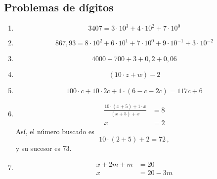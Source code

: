 \documentclass{sn-guia}
\begin{document}
\subsection{Problemas de dígitos}
\begin{enumerate}
    \item \begin{equation*}
        3407 = 3\cdot 10^3 + 4\cdot 10^2 + 7\cdot 10^0
    \end{equation*}
    \item \begin{equation*}
        867,93 = 8\cdot 10^2 + 6\cdot 10^1 + 7\cdot 10^0 + 9\cdot 10^{-1} + 3\cdot 10^{-2}
    \end{equation*}
    \item \begin{equation*}
        4000 + 700 + 3 + 0,2 + 0,06
    \end{equation*}
    \item \begin{equation*}
        \left( 10\cdot z + w \right) - 2 
    \end{equation*}
    \item 
    \begin{equation*}
        100\cdot c + 10\cdot 2c + 1\cdot \left( 6 -c -2c \right) = 117c + 6
    \end{equation*}
    \item \begin{align*}
        \frac{10\cdot(x+5) + 1\cdot x}{(x+5) + x} &= 8 \\
        x &= 2
    \end{align*}
    Así, el número buscado es
    \begin{equation*}
        10\cdot(2+5) + 2 = 72 \,,
    \end{equation*}
    y su sucesor es 73.
    \item \begin{align*}
        x + 2m + m &= 20 \\
        x &= 20 - 3m
    \end{align*}
\end{enumerate}
\end{document}
